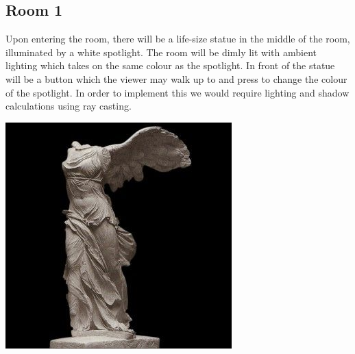 \documentclass[12pt,a4paper]{report}
\begin{document}
\subsection*{Room 1}
\par Upon entering the room, there will be a life-size statue in the middle of the room, illuminated by a white spotlight. The room will be dimly lit with ambient lighting which takes on the same colour as the spotlight. In front of the statue will be a button which the viewer may walk up to and press to change the colour of the spotlight. In order to implement this we would require lighting and shadow calculations using ray casting.
\begin{center}
\includegraphics[scale=0.7]{img/nike.jpg}
\end{center}

\pagebreak
\end{document}
